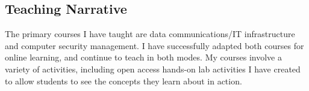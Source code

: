 \documentclass[10pt, letter]{article}
\begin{document}
\subsection*{Teaching Narrative}

The primary courses I have taught are data communications/IT infrastructure
and computer security management. I have successfully adapted both courses for 
online learning, and continue to teach in both modes. My courses involve a variety of activities,
including open access hands-on lab activities I have created to allow students to 
see the concepts they learn about in action. 


\end{document}
